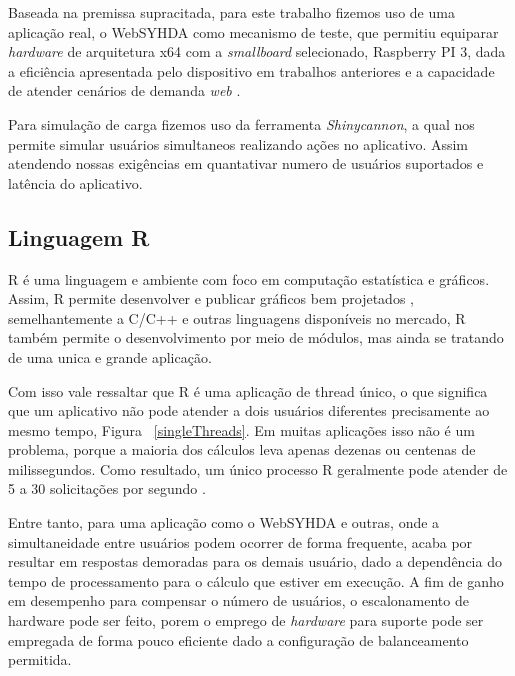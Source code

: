 \documentclass[12pt,english,brazil]{article}
\begin{document}
Baseada na premissa supracitada, para este trabalho fizemos uso de uma aplicação real, o WebSYHDA como mecanismo de teste, que permitiu equiparar \emph{hardware} de arquitetura x64 com a \emph{smallboard} selecionado, Raspberry PI 3, dada a eficiência apresentada pelo dispositivo em trabalhos anteriores e a capacidade de atender cenários de demanda \emph{web} \cite{silva2019estudo}.

Para simulação de carga fizemos uso da ferramenta \emph{Shinycannon}, a qual nos permite simular usuários simultaneos realizando ações no aplicativo. Assim atendendo nossas exigências em quantativar numero de usuários suportados e latência do aplicativo.



\subsection{Linguagem R} \label{sec:R}

R é uma linguagem e ambiente com foco em computação estatística e gráficos. Assim, R permite desenvolver e publicar gráficos bem projetados \cite{whatR}, semelhantemente a C/C++ e outras linguagens disponíveis no mercado, R também permite o desenvolvimento por meio de módulos, mas ainda se tratando de uma unica e grande aplicação.

Com isso vale ressaltar que R é uma aplicação de thread único, o que significa que um aplicativo não pode atender a dois usuários diferentes precisamente ao mesmo tempo, Figura ~\ref{singleThreads}. Em muitas aplicações isso não é um problema, porque a maioria dos cálculos leva apenas dezenas ou centenas de milissegundos. Como resultado, um único processo R geralmente pode atender de 5 a 30 solicitações por segundo \cite{ShinyappsEscalabilidade}. 

Entre tanto, para uma aplicação como o WebSYHDA e outras, onde a simultaneidade entre usuários podem ocorrer de forma frequente, acaba por resultar em respostas demoradas para os demais usuário, dado a dependência do tempo de processamento para o cálculo que estiver em execução. A fim de ganho em desempenho para compensar o número de usuários, o escalonamento de hardware pode ser feito, porem o emprego de \emph{hardware} para suporte pode ser empregada de forma pouco eficiente dado a configuração de balanceamento permitida. %
\end{document}

